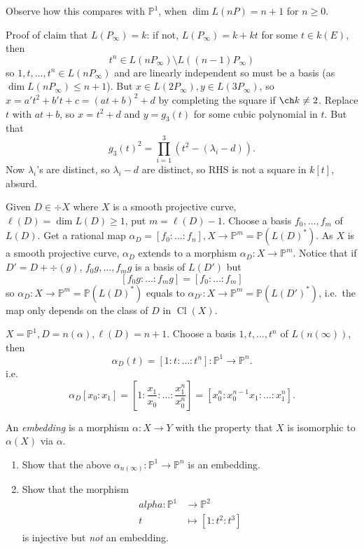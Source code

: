 \documentclass[a4paper]{article}
\DeclareMathOperator{\Cl}{Cl}
\renewcommand*{\P}{\mathbb{P}}
\begin{document}
\begin{eg}
  Observe how this compares with \(\P^1\), when \(\dim L(nP) = n + 1\) for \(n \geq 0\).

  Proof of claim that \(L(P_\infty) = k\): if not, \(L(P_\infty) = k + kt\) for some \(t \in k(E)\), then
  \[
    t^n \in L(nP_\infty) \setminus L((n - 1)P_\infty)
  \]
  so \(1, t, \dots, t^n \in L(nP_\infty)\) and are linearly independent so must be a basis (as \(\dim L(nP_\infty) \leq n + 1\)). But \(x \in L(2P_\infty), y \in L(3P_\infty)\), so \(x = a't^2 + b't + c = (at + b)^2 + d\) by completing the square if \(\ch k \neq 2\). Replace \(t\) with \(at + b\), so \(x = t^2 + d\) and \(y = g_3(t)\) for some cubic polynomial in \(t\). But that
  \[
    g_3(t)^2 = \prod_{i = 1}^3 (t^2 - (\lambda_i - d)).
  \]
  Now \(\lambda_i\)'s are distinct, so \(\lambda_i - d\) are distinct, so RHS is not a square in \(k[t]\), absurd.
\end{eg}

Given \(D \in \div X\) where \(X\) is a smooth projective curve, \(\ell(D) = \dim L(D) \geq 1\), put \(m = \ell (D) - 1\). Choose a basis \(f_0, \dots, f_m\) of \(L(D)\). Get a rational map \(\alpha_D = [f_0: \dots: f_n], X \to \P^m = \P(L(D)^*)\). As \(X\) is a smooth projective curve, \(\alpha_D\) extends to a morphism \(\alpha_D: X \to \P^m\). Notice that if \(D' = D + \div(g)\), \(f_0g, \dots, f_mg\) is a basis of \(L(D')\) but
\[
  [f_0g: \dots: f_mg] = [f_0: \dots: f_m]
\]
so \(\alpha_D: X \to \P^m = \P(L(D)^*)\) equals to \(\alpha_{D'}: X \to \P^m = \P(L(D')^*)\), i.e.\ the map only depends on the class of \(D\) in \(\Cl(X)\).

\begin{eg}
  \(X = \P^1, D = n(\alpha), \ell(D) = n + 1\). Choose a basis \(1, t, \dots, t^n\) of \(L(n(\infty))\), then
  \[
    \alpha_D(t) = [1:t: \dots: t^n]: \P^1 \to \P^n.
  \]
  i.e.
  \[
    \alpha_D[x_0: x_1] = [1: \frac{x_1}{x_0}: \dots: \frac{x_1^n}{x_0^n}] = [x_0^n: x_0^{n - 1}x_1: \dots: x_1^n].
  \]
\end{eg}

\begin{definition}[Embedding]
  An \emph{embedding} is a morphism \(\alpha: X \to Y\) with the property that \(X\) is isomorphic to \(\alpha(X)\) via \(\alpha\).
\end{definition}

\begin{ex}\leavevmode
  \begin{enumerate}
  \item Show that the above \(\alpha_{n(\infty)}: \P^1 \to \P^n\) is an embedding.
  \item Show that the morphism
    \begin{align*}
      alpha: \P^1 &\to \P^2 \\
      t &\mapsto [1: t^2: t^3]
    \end{align*}
    is injective but \emph{not} an embedding.
  \end{enumerate}
\end{ex}
\end{document}
